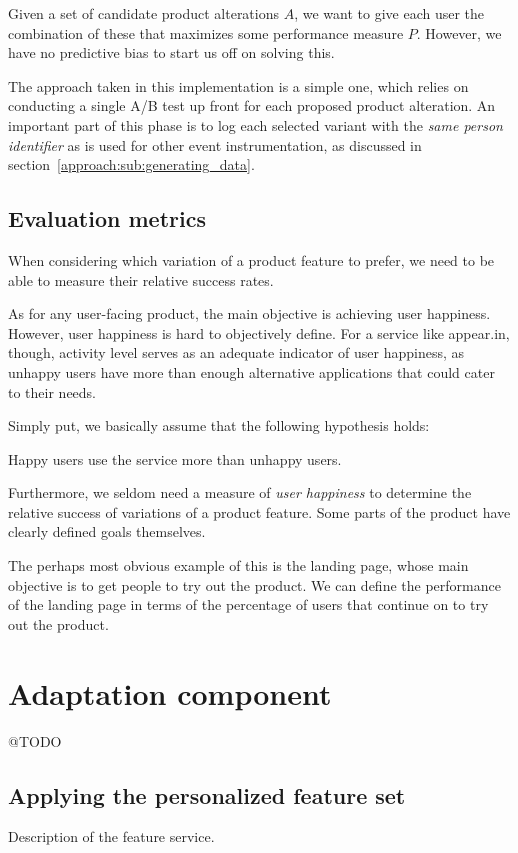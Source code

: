 Given a set of candidate product alterations $A$, we want to give each user the combination of these that maximizes some performance measure $P$. However, we have no predictive bias to start us off on solving this.

The approach taken in this implementation is a simple one, which relies on conducting a single A/B test up front for each proposed product alteration. An important part of this phase is to log each selected variant with the \emph{same person identifier} as is used for other event instrumentation, as discussed in section~\ref{approach:sub:generating_data}.


\subsection{Evaluation metrics} %
\label{approach:sec:evaluation_metrics}

When considering which variation of a product feature to prefer, we need to be able to measure their relative success rates.

As for any user-facing product, the main objective is achieving user happiness. However, user happiness is hard to objectively define. For a service like appear.in, though, activity level serves as an adequate indicator of user happiness, as unhappy users have more than enough alternative applications that could cater to their needs.

Simply put, we basically assume that the following hypothesis holds:

\begin{hypothesis}
  Happy users use the service more than unhappy users.
\end{hypothesis}

Furthermore, we seldom need a measure of \emph{user happiness} to determine the relative success of variations of a product feature. Some parts of the product have clearly defined goals themselves.

The perhaps most obvious example of this is the landing page, whose main objective is to get people to try out the product. We can define the performance of the landing page in terms of the percentage of users that continue on to try out the product.

\section{Adaptation component} %
\label{approach:sec:adaptation_component}

@TODO

\subsection{Applying the personalized feature set} %
\label{approach:sec:applying_the_personalized_feature_set}

Description of the feature service.
